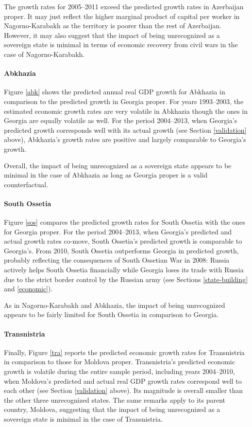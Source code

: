 \documentclass[12pt,a4paper]{article}%
\begin{document}
The growth rates for 2005--2011 exceed the predicted growth rates in Azerbaijan proper.
It may just reflect the higher marginal product of capital per worker in Nagorno-Karabakh as the territory is poorer than the rest of Azerbaijan. 
However, it may also suggest that the impact of being unrecognized as a sovereign state is minimal in terms of economic recovery from civil wars in the case of Nagorno-Karabakh.

\paragraph{Abkhazia}
Figure \ref{abk} shows the predicted annual real GDP growth for Abkhazia in comparison to the predicted growth in Georgia proper. 
For years 1993--2003, the estimated economic growth rates are very volatile in Abkhazia though the ones in Georgia are equally volatile as well.
For the period 2004--2013, when Georgia's predicted growth corresponds well with its actual growth (see Section \ref{validation} above), Abkhazia's growth rates are positive and largely comparable to Georgia's growth.   

Overall, the impact of being unrecognized as a sovereign state appears to be minimal in the case of Abkhazia as long as Georgia proper is a valid counterfactual.

\paragraph{South Ossetia}
Figure \ref{sos} compares the predicted growth rates for South Ossetia with the ones for Georgia proper.
For the period 2004--2013, when Georgia's predicted and actual growth rates co-move, South Ossetia's predicted growth is comparable to Georgia's.
From 2010, South Ossetia outperforms Georgia in predicted growth, probably reflecting the consequences of South Ossetian War in 2008: Russia actively helps South Ossetia financially while Georgia loses its trade with Russia due to the strict border control by the Russian army (see Sections \ref{state-building} and \ref{economic}).

As in Nagorno-Karabakh and Abkhazia, the impact of being unrecognized appears to be fairly limited for South Ossetia in comparison to Georgia.

\paragraph{Transnistria}
Finally, Figure \ref{tra} reports the predicted economic growth rates for Transnistria in comparison to those for Moldova proper. 
Transnistria's predicted economic growth is volatile during the entire sample period, including years 2004--2010, when Moldova's predicted and actual real GDP growth rates correspond well to each other (see Section \ref{validation} above). 
Its magnitude is overall smaller than the other three unrecognized states.
The same remarks apply to its parent country, Moldova, suggesting that the impact of being unrecognized as a sovereign state is minimal in the case of Transnistria.
\end{document}
